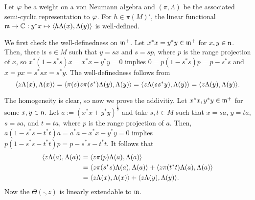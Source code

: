 \documentclass{../../../small}
\begin{document}
\begin{prop}
Let $\varphi$ be a weight on a von Neumann algebra and $(\pi,\Lambda)$ be the associated semi-cyclic representation to $\varphi$.
For $h\in\pi(M)'$, the linear functional $\mathfrak{m}\to\mathbb{C}:y^*x\mapsto\langle h\Lambda(x),\Lambda(y)\rangle$ is well-defined.
\end{prop}
\begin{pf}
We first check the well-definedness on $\mathfrak{m}^+$.
Let $x^*x=y^*y\in\mathfrak{m}^+$ for $x,y\in\mathfrak{n}$.
Then, there is $s\in M$ such that $y=sx$ and $s=sp$, where $p$ is the range projection of $x$, so $x^*(1-s^*s)x=x^*x-y^*y=0$ implies $0=p(1-s^*s)p=p-s^*s$ and $x=px=s^*sx=s^*y$.
The well-definedness follows from
\[\langle z\Lambda(x),\Lambda(x)\rangle=\langle\pi(s)z\pi(s^*)\Lambda(y),\Lambda(y)\rangle=\langle z\Lambda(ss^*y),\Lambda(y)\rangle=\langle z\Lambda(y),\Lambda(y)\rangle.\]

The homogeneity is clear, so now we prove the addivitiy.
Let $x^*x,y^*y\in\mathfrak{m}^+$ for some $x,y\in\mathfrak{n}$.
Let $a:=(x^*x+y^*y)^{\frac12}$ and take $s,t\in M$ such that $x=sa$, $y=ta$, $s=sa$, and $t=ta$, where $p$ is the range projection of $a$.
Then, $a(1-s^*s-t^*t)a=a^*a-x^*x-y^*y=0$ implies $p(1-s^*s-t^*t)p=p-s^*s-t^*t$.
It follows that
\begin{align*}
\langle z\Lambda(a),\Lambda(a)\rangle
&=\langle z\pi(p)\Lambda(a),\Lambda(a)\rangle\\
&=\langle z\pi(s^*s)\Lambda(a),\Lambda(a)\rangle+\langle z\pi(t^*t)\Lambda(a),\Lambda(a)\rangle\\
&=\langle z\Lambda(x),\Lambda(x)\rangle+\langle z\Lambda(y),\Lambda(y)\rangle.
\end{align*}
Now the $\Theta(\cdot,z)$ is linearly extendable to $\mathfrak{m}$.
\end{pf}
\end{document}
